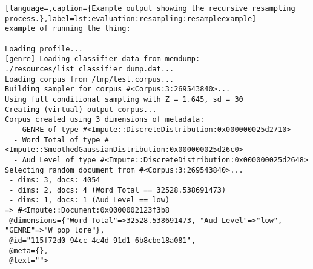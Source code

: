 \begin{lstlisting}[language=,caption={Example output showing the recursive resampling process.},label=lst:evaluation:resampling:resampleexample]
example of running the thing:

Loading profile...
[genre] Loading classifier data from memdump: ./resources/list_classifier_dump.dat...
Loading corpus from /tmp/test.corpus...
Building sampler for corpus #<Corpus:3:269543840>...
Using full conditional sampling with Z = 1.645, sd = 30
Creating (virtual) output corpus...
Corpus created using 3 dimensions of metadata:
  - GENRE of type #<Impute::DiscreteDistribution:0x000000025d2710>
  - Word Total of type #<Impute::SmoothedGaussianDistribution:0x000000025d26c0>
  - Aud Level of type #<Impute::DiscreteDistribution:0x000000025d2648>
Selecting random document from #<Corpus:3:269543840>...
 - dims: 3, docs: 4054
 - dims: 2, docs: 4 (Word Total == 32528.538691473)
 - dims: 1, docs: 1 (Aud Level == low)
=> #<Impute::Document:0x0000002123f3b8
 @dimensions={"Word Total"=>32528.538691473, "Aud Level"=>"low", "GENRE"=>"W_pop_lore"},
 @id="115f72d0-94cc-4c4d-91d1-6b8cbe18a081",
 @meta={},
 @text="">
\end{lstlisting}




